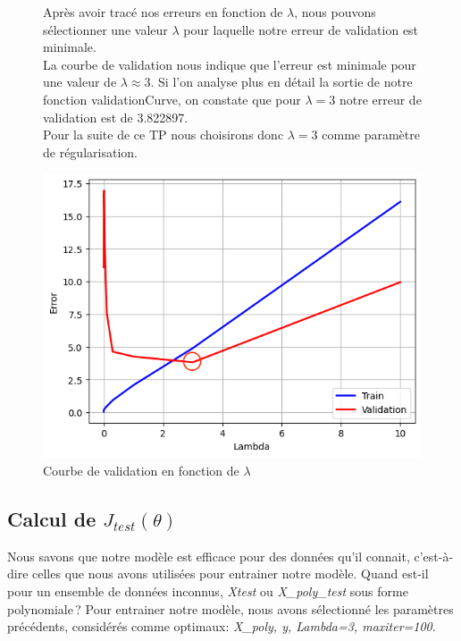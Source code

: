 \vspace{.2cm}

\begin{figure}[!h]
    \begin{minipage}{.44\linewidth}
        Après avoir tracé nos erreurs en fonction de $\lambda$, nous pouvons sélectionner une valeur $\lambda$ pour laquelle notre erreur de validation est minimale. \\
        La courbe de validation nous indique que l'erreur est minimale pour une valeur de $\lambda \approx 3$. Si l’on analyse plus en détail la sortie de notre fonction validationCurve, on constate que pour $\lambda = 3$ notre erreur de validation est 
        de 3.822897. \\

        Pour la suite de ce TP nous choisirons donc $\lambda = 3$ comme paramètre de régularisation.
    \end{minipage}\hfill
    \begin{minipage}{.56\linewidth}
        \begin{center}
            \includegraphics[width=.9\textwidth]{./img/5.3.png}
            \caption{\label{fig:validation-curve-poly}Courbe de validation en fonction de $\lambda$}  
        \end{center}
    \end{minipage}
\end{figure}


\subsection{Calcul de $J_{test}(\theta)$}

Nous savons que notre modèle est efficace pour des données qu'il connait, c'est-à-dire celles que nous avons utilisées pour entrainer notre modèle. Quand est-il pour un ensemble de données inconnus, \textit{Xtest} ou \textit{X\_poly\_test} sous forme polynomiale\,? 
Pour entrainer notre modèle, nous avons sélectionné les paramètres précédents, considérés comme optimaux: \textit{X\_poly, y, Lambda=3, maxiter=100}.


